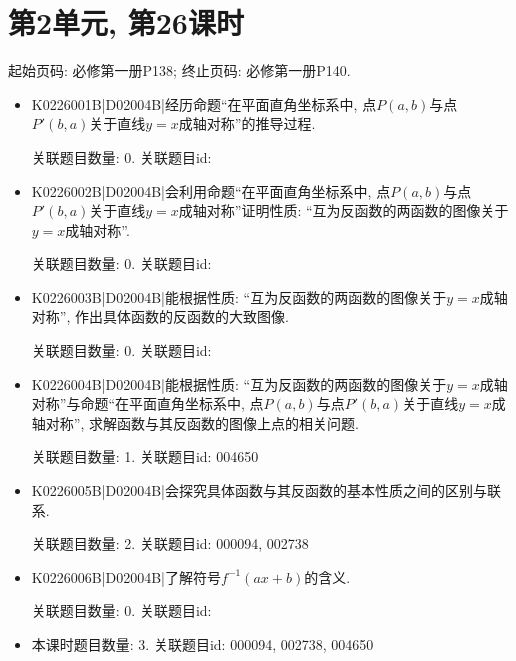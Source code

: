 \section*{第2单元, 第26课时}
起始页码: 必修第一册P138; 终止页码: 必修第一册P140.
\begin{itemize}
\item K0226001B|D02004B|经历命题``在平面直角坐标系中, 点$P(a,b)$与点$P'(b,a)$关于直线$y=x$成轴对称''的推导过程.

关联题目数量: 0. 关联题目id: 

\item K0226002B|D02004B|会利用命题``在平面直角坐标系中, 点$P(a,b)$与点$P'(b,a)$关于直线$y=x$成轴对称''证明性质: ``互为反函数的两函数的图像关于$y=x$成轴对称''.

关联题目数量: 0. 关联题目id: 

\item K0226003B|D02004B|能根据性质: ``互为反函数的两函数的图像关于$y=x$成轴对称'', 作出具体函数的反函数的大致图像.

关联题目数量: 0. 关联题目id: 

\item K0226004B|D02004B|能根据性质: ``互为反函数的两函数的图像关于$y=x$成轴对称''与命题``在平面直角坐标系中, 点$P(a,b)$与点$P'(b,a)$关于直线$y=x$成轴对称'', 求解函数与其反函数的图像上点的相关问题.

关联题目数量: 1. 关联题目id: 004650

\item K0226005B|D02004B|会探究具体函数与其反函数的基本性质之间的区别与联系.

关联题目数量: 2. 关联题目id: 000094, 002738

\item K0226006B|D02004B|了解符号$f^{-1}(ax+b)$的含义.

关联题目数量: 0. 关联题目id: 

\item 本课时题目数量: 3. 关联题目id: 000094, 002738, 004650

\end{itemize}

